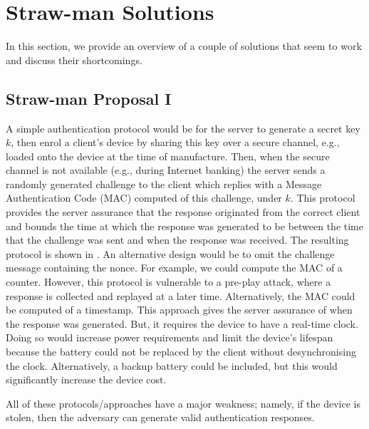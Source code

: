 


\section{Straw-man Solutions}\label{sec::Straw-man-Solutions}
In this section, we provide an overview of a couple of solutions that seem to work and discuss their shortcomings. 

\subsection{Straw-man Proposal I}\label{sec:straw-man-1}

A simple authentication protocol would be for the server to generate a secret key $k$, then enrol a client's device by sharing this key over a secure channel, e.g., loaded onto the device at the time of manufacture.
Then, when the secure channel is not available (e.g., during Internet banking) the server sends a
randomly generated challenge to the client which replies with a Message Authentication Code (MAC)  computed of this challenge, under $k$.
This protocol provides the server assurance
that the response originated from the correct client and
bounds the time at which the response was generated to be between the time that the challenge was sent and when the response was received. 
%
%
The resulting protocol is shown in .  An alternative design would be to omit the challenge message containing
the nonce. For example, we could compute the MAC of a counter. However, this protocol is vulnerable to a pre-play attack, where a
response is collected and replayed at a later time. Alternatively, the
MAC could be computed of a timestamp. This approach
gives the server assurance of when the response was generated.  But, it
requires the device to have a real-time clock. Doing so
would increase power requirements and limit the device's lifespan because
the battery could not be replaced by the client without desynchronising
the clock. Alternatively, a backup battery could be included, but this
would significantly increase the device cost.

All of these protocols/approaches have a major weakness; namely, if the device is stolen, then the adversary can generate valid
authentication responses. %







